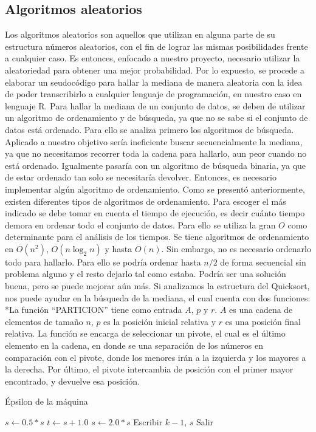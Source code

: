 \documentclass[final,a4paper,romanappendices]{IEEEtran}\usepackage[]{graphicx}\usepackage[]{color}
\theoremstyle{definition}
\begin{document}
\subsection{Algoritmos aleatorios}
Los algoritmos aleatorios son aquellos que utilizan en alguna parte de su estructura números aleatorios, con el fin de lograr las mismas posibilidades frente a cualquier caso. Es entonces, enfocado a nuestro proyecto, necesario utilizar la aleatoriedad para obtener una mejor probabilidad. Por lo expuesto, se procede a elaborar un seudocódigo para hallar la mediana de manera aleatoria con la idea de poder transcribirlo a cualquier lenguaje de programación, en nuestro caso en lenguaje R. Para hallar la mediana de un conjunto de datos, se deben de utilizar un algoritmo de ordenamiento y de búsqueda, ya que no se sabe si el conjunto de datos está ordenado. Para ello se analiza primero los algoritmos de búsqueda. Aplicado a nuestro objetivo sería ineficiente buscar secuencialmente la mediana, ya que no necesitamos recorrer toda la cadena para hallarlo, aun peor cuando no está ordenado. Igualmente pasaría con un algoritmo de búsqueda binaria, ya que de estar ordenado tan solo se necesitaría devolver. Entonces, es necesario implementar algún algoritmo de ordenamiento.
Como se presentó anteriormente, existen diferentes tipos de algoritmos de ordenamiento. Para escoger el más indicado se debe tomar en cuenta el tiempo de ejecución, es decir cuánto tiempo demora en ordenar todo el conjunto de datos. Para ello se utiliza la gran $O$ como determinante para el análisis de los tiempos. Se tiene algoritmos de ordenamiento en $O(n^2)$, $O(n\log_{2}n)$ y hasta $O(n)$.
Sin embargo, no es necesario ordenarlo todo para hallarlo. Para ello se podría ordenar hasta $n/2$ de forma secuencial sin problema alguno y el resto dejarlo tal como estaba. Podría ser una solución buena, pero se puede mejorar aún más. Si analizamos la estructura del Quicksort, nos puede ayudar en la búsqueda de la mediana, el cual cuenta con dos funciones:
*La función ``PARTICION'' tiene como entrada $A$, $p$ y $r$. $A$ es una cadena de elementos de tamaño $n$, $p$ es la posición inicial relativa y $r$ es una posición final relativa. La función se encarga de seleccionar un pivote, el cual es el último elemento en la cadena, en donde se una separación de los números en comparación con el pivote, donde los menores irán a la izquierda y los mayores a la derecha. Por último, el pivote intercambia de posición con el primer mayor encontrado, y devuelve esa posición.

\begin{algorithm}[ht]
\caption{Épsilon de la máquina}
\begin{algorithmic}[1]
	\State $s \gets  0.5*s$
	\State $t \gets s+1.0$
	\State $s \gets 2.0*s$
	\State Escribir $k-1$, $s$
	\State Salir
	\EndIf
	\EndFor
\end{algorithmic}
\end{algorithm}


\nocite{*}
\printbibliography
\end{document}
